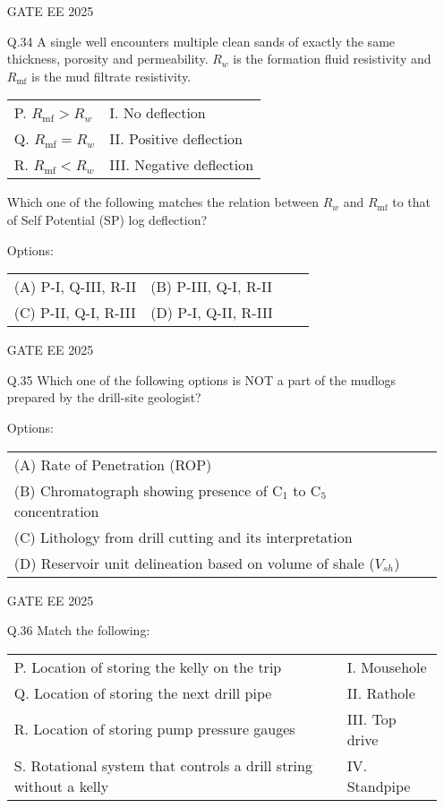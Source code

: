 \documentclass[journal]{IEEEtran}
\begin{document}
\begin{enumerate}[leftmargin=*,series=q]
GATE EE 2025
 \vspace{0.5cm} 
\item[Q.34] A single well encounters multiple clean sands of exactly the same thickness, porosity and permeability. $R_w$ is the formation fluid resistivity and $R_{\text{mf}}$ is the mud filtrate resistivity.

\begin{tabular}{ll}
P. $R_{\text{mf}} > R_w$ & I. No deflection \\
Q. $R_{\text{mf}} = R_w$ & II. Positive deflection \\
R. $R_{\text{mf}} < R_w$ & III. Negative deflection \\
\end{tabular}

Which one of the following matches the relation between $R_w$ and $R_{\text{mf}}$ to that of Self Potential (SP) log deflection?

Options:
\begin{tabular}{llll}
(A) P-I, Q-III, R-II & (B) P-III, Q-I, R-II \\
(C) P-II, Q-I, R-III & (D) P-I, Q-II, R-III
\end{tabular}

GATE EE 2025
 \vspace{0.5cm} 
\item[Q.35] Which one of the following options is NOT a part of the mudlogs prepared by the drill-site geologist?

Options:
\begin{tabular}{ll}
(A) Rate of Penetration (ROP) \\
(B) Chromatograph showing presence of C$_1$ to C$_5$ concentration \\
(C) Lithology from drill cutting and its interpretation \\
(D) Reservoir unit delineation based on volume of shale ($V_{sh}$)
\end{tabular}

GATE EE 2025
 \vspace{0.5cm} 
\item[Q.36] Match the following:

\begin{tabular}{ll}
P. Location of storing the kelly on the trip & I. Mousehole \\
Q. Location of storing the next drill pipe & II. Rathole \\
R. Location of storing pump pressure gauges & III. Top drive \\
S. Rotational system that controls a drill string without a kelly & IV. Standpipe \\
\end{tabular}


\end{enumerate}
\end{document}

